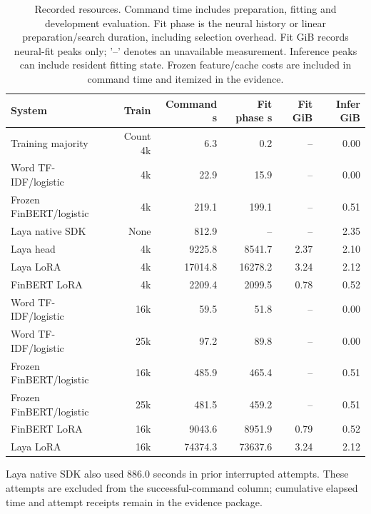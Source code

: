 \begin{table}[!htbp]
\centering
\caption{Recorded resources. Command time includes preparation, fitting and development evaluation. Fit phase is the neural history or linear preparation/search duration, including selection overhead. Fit GiB records neural-fit peaks only; '--' denotes an unavailable measurement. Inference peaks can include resident fitting state. Frozen feature/cache costs are included in command time and itemized in the evidence.}
\label{tab:resources}
\small
\setlength{\tabcolsep}{3.5pt}
\begin{tabularx}{\linewidth}{@{}Xrrrrr@{}}
\toprule
System & Train & Command s & Fit phase s & Fit GiB & Infer GiB\\
\midrule
Training majority & Count 4k & 6.3 & 0.2 & -- & 0.00\\
Word TF-IDF/logistic & 4k & 22.9 & 15.9 & -- & 0.00\\
Frozen FinBERT/logistic & 4k & 219.1 & 199.1 & -- & 0.51\\
Laya native SDK & None & 812.9 & -- & -- & 2.35\\
Laya head & 4k & 9225.8 & 8541.7 & 2.37 & 2.10\\
Laya LoRA & 4k & 17014.8 & 16278.2 & 3.24 & 2.12\\
FinBERT LoRA & 4k & 2209.4 & 2099.5 & 0.78 & 0.52\\
Word TF-IDF/logistic & 16k & 59.5 & 51.8 & -- & 0.00\\
Word TF-IDF/logistic & 25k & 97.2 & 89.8 & -- & 0.00\\
Frozen FinBERT/logistic & 16k & 485.9 & 465.4 & -- & 0.51\\
Frozen FinBERT/logistic & 25k & 481.5 & 459.2 & -- & 0.51\\
FinBERT LoRA & 16k & 9043.6 & 8951.9 & 0.79 & 0.52\\
Laya LoRA & 16k & 74374.3 & 73637.6 & 3.24 & 2.12\\
\bottomrule
\end{tabularx}
\end{table}

\FloatBarrier
Laya native SDK also used 886.0 seconds in prior interrupted attempts. These attempts are excluded from the successful-command column; cumulative elapsed time and attempt receipts remain in the evidence package.
